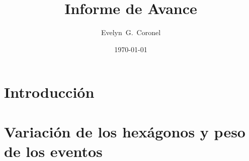 
\usepackage{natbib}





\title{Informe de Avance}
\author{Evelyn~G.~Coronel}


\date[]{\lowercase{\today}} %


\maketitle

\section{Introducción}
\graphicspath{{report_0_Introduccion/}}


\section{Variación de los hexágonos y peso de los eventos}
\graphicspath{{report_1_13_04_2020/}}


% 

% 

